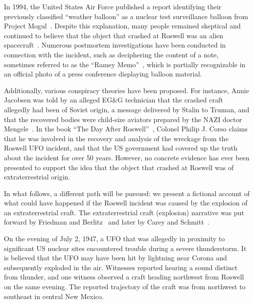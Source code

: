 In 1994, the United States Air Force published a report identifying their previously classified ``weather balloon''
as a nuclear test surveillance balloon from Project Mogul~\cite{Weaver1995Jan}.
Despite this explanation, many people remained skeptical and continued to believe that the object that crashed at Roswell
was an alien spacecraft~\cite{Randle_2022}.
Numerous postmortem investigations have been conducted in connection with the incident, such as deciphering the content of a note,
sometimes referred to as the ``Ramey Memo''~\cite{Houran2002Mar}, 
which is partially recognizable in an official photo of a press conference displaying balloon material.

Additionally, various conspiracy theories have been proposed.
For instance, Annie Jacobsen was told by an alleged EG{\&}G technician that the crashed craft allegedly had been of
Soviet origin, a message delivered by Stalin to Truman, and that the recovered bodies were child-size aviators
prepared by the NAZI doctor Mengele~\cite[Chapter~21]{Jacobsen2011}.
In the book ``The Day After Roswell''~\cite{Corso1998Jun}, Colonel Philip J. Corso
claims that he was involved in the recovery and analysis of the wreckage from the Roswell UFO incident,
and that the US government had covered up the truth about the incident for over 50 years.
However, no concrete evidence has ever been presented to support the idea that the object
that crashed at Roswell was of extraterrestrial origin.

In what follows, a different path will be pursued: we present a fictional account of what could have happened if the Roswell incident was caused by the explosion of an extraterrestrial craft. The extraterrestrial craft (explosion) narrative was put forward by Friedman and Berlitz~\cite{Berlitz-Roswell,Friedman-Roswell} and later by Carey and Schmitt~\cite{CareySchmitt}.

On the evening of July 2, 1947, a UFO that was allegedly in proximity to significant US nuclear sites encountered trouble during a severe thunderstorm. It is believed that the UFO may have been hit by lightning near Corona and subsequently exploded in the air. Witnesses reported hearing a sound distinct from thunder, and one witness observed a craft heading northwest from Roswell on the same evening. The reported trajectory of the craft was from northwest to southeast in central New Mexico.

